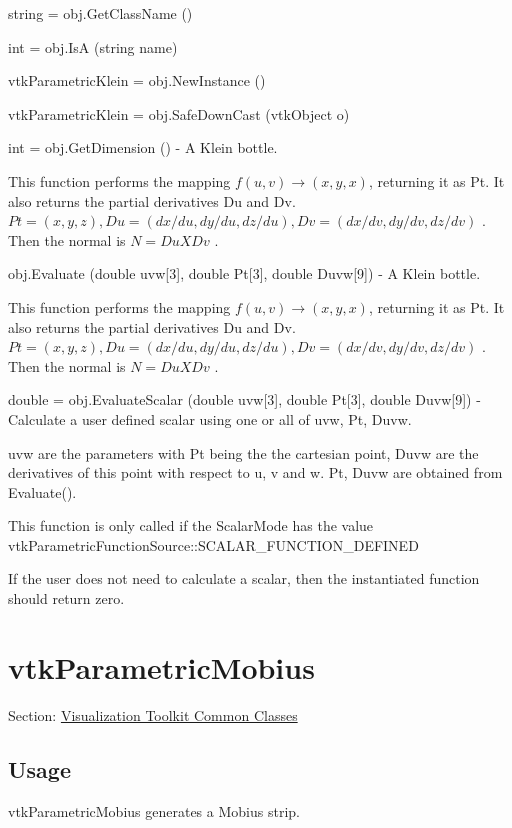 \begin{DoxyItemize}
\item {\ttfamily string = obj.\-Get\-Class\-Name ()}  
\item {\ttfamily int = obj.\-Is\-A (string name)}  
\item {\ttfamily vtk\-Parametric\-Klein = obj.\-New\-Instance ()}  
\item {\ttfamily vtk\-Parametric\-Klein = obj.\-Safe\-Down\-Cast (vtk\-Object o)}  
\item {\ttfamily int = obj.\-Get\-Dimension ()} -\/ A Klein bottle.

This function performs the mapping $f(u,v) \rightarrow (x,y,x)$, returning it as Pt. It also returns the partial derivatives Du and Dv. $Pt = (x, y, z), Du = (dx/du, dy/du, dz/du), Dv = (dx/dv, dy/dv, dz/dv)$ . Then the normal is $N = Du X Dv$ .  
\item {\ttfamily obj.\-Evaluate (double uvw\mbox{[}3\mbox{]}, double Pt\mbox{[}3\mbox{]}, double Duvw\mbox{[}9\mbox{]})} -\/ A Klein bottle.

This function performs the mapping $f(u,v) \rightarrow (x,y,x)$, returning it as Pt. It also returns the partial derivatives Du and Dv. $Pt = (x, y, z), Du = (dx/du, dy/du, dz/du), Dv = (dx/dv, dy/dv, dz/dv)$ . Then the normal is $N = Du X Dv$ .  
\item {\ttfamily double = obj.\-Evaluate\-Scalar (double uvw\mbox{[}3\mbox{]}, double Pt\mbox{[}3\mbox{]}, double Duvw\mbox{[}9\mbox{]})} -\/ Calculate a user defined scalar using one or all of uvw, Pt, Duvw.

uvw are the parameters with Pt being the the cartesian point, Duvw are the derivatives of this point with respect to u, v and w. Pt, Duvw are obtained from Evaluate().

This function is only called if the Scalar\-Mode has the value vtk\-Parametric\-Function\-Source\-::\-S\-C\-A\-L\-A\-R\-\_\-\-F\-U\-N\-C\-T\-I\-O\-N\-\_\-\-D\-E\-F\-I\-N\-E\-D

If the user does not need to calculate a scalar, then the instantiated function should return zero.


\end{DoxyItemize}\hypertarget{vtkcommon_vtkparametricmobius}{}\section{vtk\-Parametric\-Mobius}\label{vtkcommon_vtkparametricmobius}
Section\-: \hyperlink{sec_vtkcommon}{Visualization Toolkit Common Classes} \hypertarget{vtkwidgets_vtkxyplotwidget_Usage}{}\subsection{Usage}\label{vtkwidgets_vtkxyplotwidget_Usage}
vtk\-Parametric\-Mobius generates a Mobius strip.

